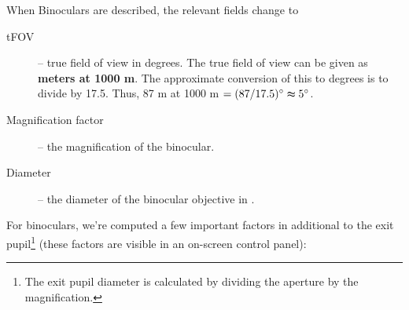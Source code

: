 When Binoculars are described, the relevant fields change to
\begin{description}
\item[tFOV] -- true field of view in degrees. The true field of view can be given as \textbf{meters at 1000 m}. The approximate conversion of this to degrees is to divide by 17.5. Thus, 87 m at 1000 m $=(87/17.5)\degree \thickapprox 5\degree$.
\item[Magnification factor] -- the magnification of the binocular.
\item[Diameter] -- the diameter of the binocular objective in \mm.
\end{description}

For binoculars, we're computed a few important factors in additional to the exit pupil\footnote{The exit pupil diameter is calculated by dividing the aperture by the magnification.} (these factors are visible in an on-screen control panel):
